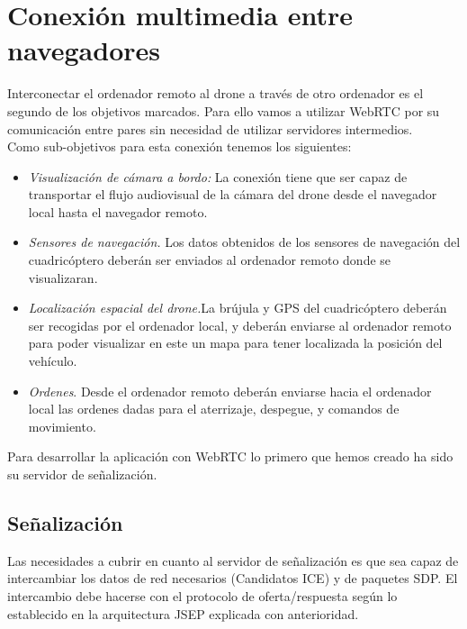 \section{Conexión multimedia entre navegadores}

Interconectar el ordenador remoto al drone a través de otro ordenador es el segundo de los objetivos marcados. Para ello vamos a utilizar WebRTC por su comunicación entre pares sin necesidad de utilizar servidores intermedios.\\

Como sub-objetivos para esta conexión tenemos los siguientes:

\begin{itemize}

\item \emph{Visualización de cámara a bordo:} La conexión tiene que ser capaz de transportar el flujo audiovisual de la cámara del drone desde el navegador local hasta el navegador remoto.

\item \emph{Sensores de navegación.} Los datos obtenidos de los sensores de navegación del cuadricóptero deberán ser enviados al ordenador remoto donde se visualizaran.

\item \emph{Localización espacial del drone.}La brújula y GPS del cuadricóptero deberán ser recogidas por el ordenador local, y deberán enviarse al ordenador remoto para poder visualizar en este un mapa para tener localizada la posición del vehículo.

\item \emph{Ordenes}. Desde el ordenador remoto deberán enviarse hacia el ordenador local las ordenes dadas para el aterrizaje, despegue, y comandos de movimiento.

\end{itemize}

Para desarrollar la aplicación con WebRTC lo primero que hemos creado ha sido su servidor de señalización.\\

\subsection{Señalización}

Las necesidades a cubrir en cuanto al servidor de señalización es que sea capaz de intercambiar los datos de red necesarios (Candidatos ICE) y de paquetes SDP. El intercambio debe hacerse con el protocolo de oferta/respuesta según lo establecido en la arquitectura JSEP explicada con anterioridad.\\

